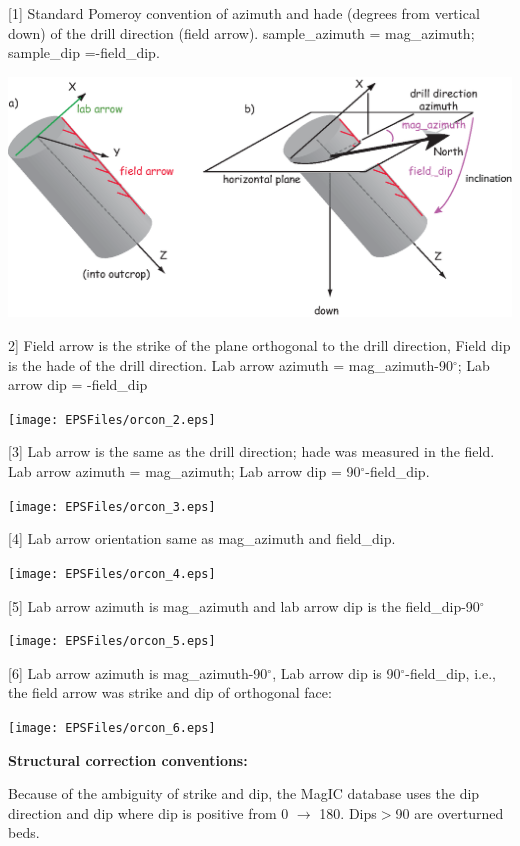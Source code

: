 \documentclass[11pt]{book}
\begin{document}
{{\parindent 0pt
[1] Standard Pomeroy convention of azimuth and hade (degrees from vertical down) of the drill direction (field arrow). sample\_azimuth = mag\_azimuth; sample\_dip =-field\_dip.

  \includegraphics[width=15cm]{EPSFiles/orcon_1.eps}

  2] Field arrow is the strike of the plane orthogonal to the drill direction, Field dip is the hade of the drill direction. Lab arrow azimuth = mag\_azimuth-90$^{\circ}$; Lab arrow dip = -field\_dip

    \texttt{[image: EPSFiles/orcon\_2.eps]}

  [3] Lab arrow is the same as the drill direction; hade was measured in the field. Lab arrow azimuth = mag\_azimuth; Lab arrow dip = 90$^{\circ}$-field\_dip.

      \texttt{[image: EPSFiles/orcon\_3.eps]}

  [4] Lab arrow orientation same as mag\_azimuth and field\_dip.

        \texttt{[image: EPSFiles/orcon\_4.eps]}

        [5]  Lab arrow azimuth is  mag\_azimuth and lab arrow dip is the  field\_dip-90$^{\circ}$

               \texttt{[image: EPSFiles/orcon\_5.eps]}


 [6] Lab arrow azimuth is mag\_azimuth-90$^{\circ}$, Lab arrow dip is 90$^{\circ}$-field\_dip, i.e., the field arrow was strike and dip of orthogonal face:

                \texttt{[image: EPSFiles/orcon\_6.eps]}
                }

{\bf Structural correction conventions:}


Because of the ambiguity of strike and dip, the MagIC database uses the dip direction and dip where dip is positive from 0 $\rightarrow$ 180. Dips$ > $90 are overturned beds.


}
\end{document}
